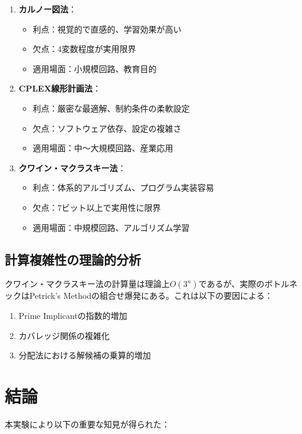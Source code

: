 \documentclass[a4j,dvipdfmx]{jsarticle}
\begin{document}
\begin{enumerate}
\item \textbf{カルノー図法}：
\begin{itemize}
\item 利点：視覚的で直感的、学習効果が高い
\item 欠点：4変数程度が実用限界
\item 適用場面：小規模回路、教育目的
\end{itemize}

\item \textbf{CPLEX線形計画法}：
\begin{itemize}
\item 利点：厳密な最適解、制約条件の柔軟設定
\item 欠点：ソフトウェア依存、設定の複雑さ
\item 適用場面：中～大規模回路、産業応用
\end{itemize}

\item \textbf{クワイン・マクラスキー法}：
\begin{itemize}
\item 利点：体系的アルゴリズム、プログラム実装容易
\item 欠点：7ビット以上で実用性に限界
\item 適用場面：中規模回路、アルゴリズム学習
\end{itemize}
\end{enumerate}

\subsection{計算複雑性の理論的分析}

クワイン・マクラスキー法の計算量は理論上$O(3^n)$であるが、実際のボトルネックはPetrick's Methodの組合せ爆発にある。これは以下の要因による：

\begin{enumerate}
\item Prime Implicantの指数的増加
\item カバレッジ関係の複雑化
\item 分配法における解候補の乗算的増加
\end{enumerate}

\section{結論}

本実験により以下の重要な知見が得られた：
\end{document}
